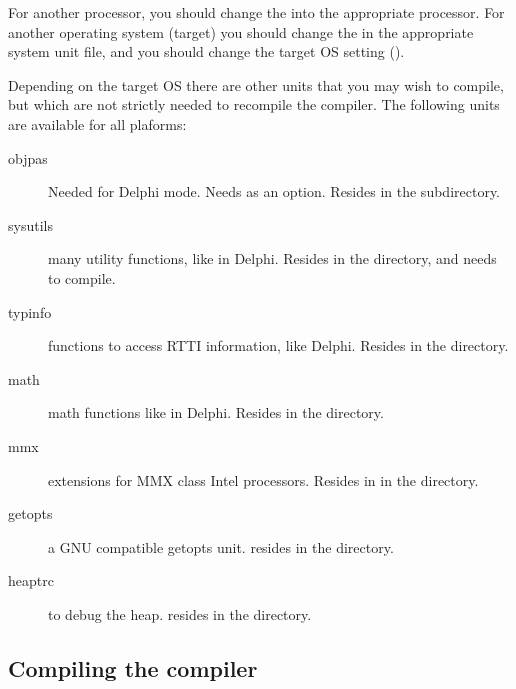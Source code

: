For another processor, you should change the  into the appropriate
processor. For another operating system (target) you should change the
 in the appropriate system unit file, and you should change
the target OS setting ().

Depending on the target OS there are other units that you may wish to
compile, but which are not strictly needed to recompile the compiler.
The following units are available for all plaforms:
\begin{description}
\item[objpas] Needed for Delphi mode. Needs  as an option. Resides
in the  subdirectory.
\item[sysutils] many utility functions, like in Delphi. Resides in the
 directory, and needs  to compile.
\item[typinfo] functions to access RTTI information, like Delphi. Resides in
the  directory.
\item[math] math functions like in Delphi. Resides in the 
directory.
\item[mmx] extensions for MMX class Intel processors. Resides in
in the  directory.
\item[getopts] a GNU compatible getopts unit. resides in the 
directory.
\item[heaptrc] to debug the heap. resides in the  directory.
\end{description}

\subsection{Compiling the compiler}

